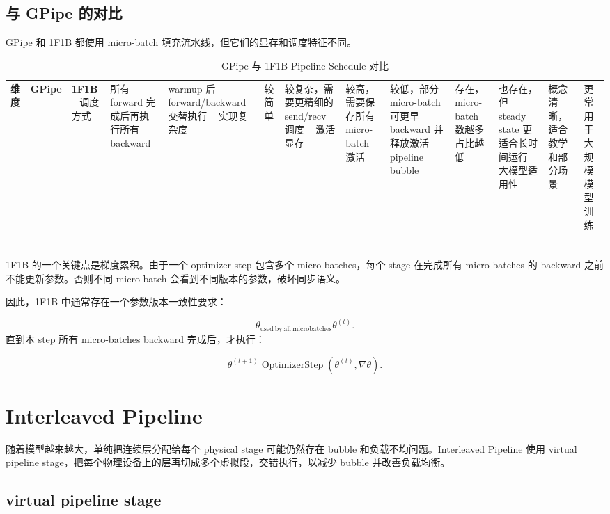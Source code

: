 \subsection{与 GPipe 的对比}
\label{subsec:gpipe-vs-onef1b}

GPipe 和 1F1B 都使用 micro-batch 填充流水线，但它们的显存和调度特征不同。

\begin{table}[H]
\centering
\small
\caption{GPipe 与 1F1B Pipeline Schedule 对比}
\label{tab:gpipe-vs-1f1b}
\begin{tabular}{p{}p{}p{}}
\toprule
\textbf{维度} & \textbf{GPipe} & \textbf{1F1B} \
\midrule
调度方式
& 所有 forward 完成后再执行所有 backward
& warmup 后 forward/backward 交替执行 \
\midrule
实现复杂度
& 较简单
& 较复杂，需要更精细的 send/recv 调度 \
\midrule
激活显存
& 较高，需要保存所有 micro-batch 激活
& 较低，部分 micro-batch 可更早 backward 并释放激活 \
\midrule
pipeline bubble
& 存在，micro-batch 数越多占比越低
& 也存在，但 steady state 更适合长时间运行 \
\midrule
大模型适用性
& 概念清晰，适合教学和部分场景
& 更常用于大规模模型训练 \
\bottomrule
\end{tabular}
\end{table}

1F1B 的一个关键点是梯度累积。由于一个 optimizer step 包含多个 micro-batches，每个 stage 在完成所有 micro-batches 的 backward 之前不能更新参数。否则不同 micro-batch 会看到不同版本的参数，破坏同步语义。

因此，1F1B 中通常存在一个参数版本一致性要求：

\[
\theta_{\mathrm{used\ by\ all\ microbatches}}
\theta^{(t)}.
\]
直到本 step 所有 micro-batches backward 完成后，才执行：

\[
\theta^{(t+1)}
\operatorname{OptimizerStep}
\left(
\theta^{(t)},\nabla\theta
\right).
\]

\section{Interleaved Pipeline}
\label{sec:interleaved-pipeline}

随着模型越来越大，单纯把连续层分配给每个 physical stage 可能仍然存在 bubble 和负载不均问题。Interleaved Pipeline 使用 virtual pipeline stage，把每个物理设备上的层再切成多个虚拟段，交错执行，以减少 bubble 并改善负载均衡。

\subsection{virtual pipeline stage}
\label{subsec:virtual-pipeline-stage}


